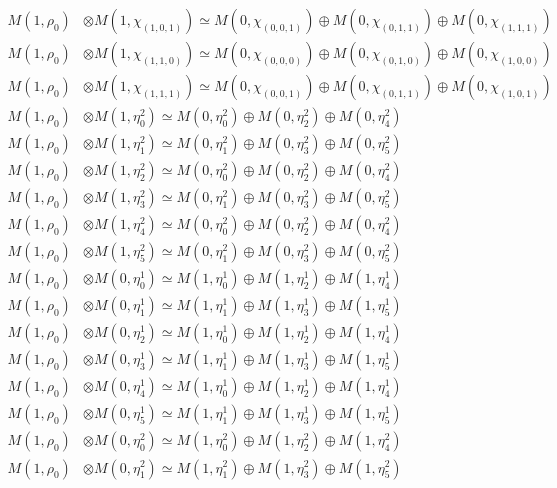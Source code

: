 \begin{align*}
M(1,\rho_{0}) &\otimes M(1,\chi_{(1,0,1)}) \simeq M(0,\chi_{(0,0,1)}) \oplus M(0,\chi_{(0,1,1)}) \oplus M(0,\chi_{(1,1,1)}) \\
M(1,\rho_{0}) &\otimes M(1,\chi_{(1,1,0)}) \simeq M(0,\chi_{(0,0,0)}) \oplus M(0,\chi_{(0,1,0)}) \oplus M(0,\chi_{(1,0,0)}) \\
M(1,\rho_{0}) &\otimes M(1,\chi_{(1,1,1)}) \simeq M(0,\chi_{(0,0,1)}) \oplus M(0,\chi_{(0,1,1)}) \oplus M(0,\chi_{(1,0,1)}) \\
M(1,\rho_{0}) &\otimes M(1,\eta^{2}_{0}) \simeq M(0,\eta^{2}_{0}) \oplus M(0,\eta^{2}_{2}) \oplus M(0,\eta^{2}_{4}) \\
M(1,\rho_{0}) &\otimes M(1,\eta^{2}_{1}) \simeq M(0,\eta^{2}_{1}) \oplus M(0,\eta^{2}_{3}) \oplus M(0,\eta^{2}_{5}) \\
M(1,\rho_{0}) &\otimes M(1,\eta^{2}_{2}) \simeq M(0,\eta^{2}_{0}) \oplus M(0,\eta^{2}_{2}) \oplus M(0,\eta^{2}_{4}) \\
M(1,\rho_{0}) &\otimes M(1,\eta^{2}_{3}) \simeq M(0,\eta^{2}_{1}) \oplus M(0,\eta^{2}_{3}) \oplus M(0,\eta^{2}_{5}) \\
M(1,\rho_{0}) &\otimes M(1,\eta^{2}_{4}) \simeq M(0,\eta^{2}_{0}) \oplus M(0,\eta^{2}_{2}) \oplus M(0,\eta^{2}_{4}) \\
M(1,\rho_{0}) &\otimes M(1,\eta^{2}_{5}) \simeq M(0,\eta^{2}_{1}) \oplus M(0,\eta^{2}_{3}) \oplus M(0,\eta^{2}_{5}) \\
M(1,\rho_{0}) &\otimes M(0,\eta^{1}_{0}) \simeq M(1,\eta^{1}_{0}) \oplus M(1,\eta^{1}_{2}) \oplus M(1,\eta^{1}_{4}) \\
M(1,\rho_{0}) &\otimes M(0,\eta^{1}_{1}) \simeq M(1,\eta^{1}_{1}) \oplus M(1,\eta^{1}_{3}) \oplus M(1,\eta^{1}_{5}) \\
M(1,\rho_{0}) &\otimes M(0,\eta^{1}_{2}) \simeq M(1,\eta^{1}_{0}) \oplus M(1,\eta^{1}_{2}) \oplus M(1,\eta^{1}_{4}) \\
M(1,\rho_{0}) &\otimes M(0,\eta^{1}_{3}) \simeq M(1,\eta^{1}_{1}) \oplus M(1,\eta^{1}_{3}) \oplus M(1,\eta^{1}_{5}) \\
M(1,\rho_{0}) &\otimes M(0,\eta^{1}_{4}) \simeq M(1,\eta^{1}_{0}) \oplus M(1,\eta^{1}_{2}) \oplus M(1,\eta^{1}_{4}) \\
M(1,\rho_{0}) &\otimes M(0,\eta^{1}_{5}) \simeq M(1,\eta^{1}_{1}) \oplus M(1,\eta^{1}_{3}) \oplus M(1,\eta^{1}_{5}) \\
M(1,\rho_{0}) &\otimes M(0,\eta^{2}_{0}) \simeq M(1,\eta^{2}_{0}) \oplus M(1,\eta^{2}_{2}) \oplus M(1,\eta^{2}_{4}) \\
M(1,\rho_{0}) &\otimes M(0,\eta^{2}_{1}) \simeq M(1,\eta^{2}_{1}) \oplus M(1,\eta^{2}_{3}) \oplus M(1,\eta^{2}_{5}) \\

\end{align*}
